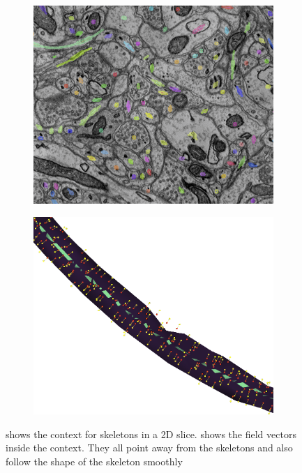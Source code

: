 \begin{figure}[htpb]
	\newcommand{\mywidth}{0.45\textwidth}
	\centering
	\begin{subfigure}[b]{\mywidth}
		\centering
		\includegraphics[width=\textwidth]{data/images/contextField/context2D.png}
		\caption{\label{fig:context}}
	\end{subfigure}
	\hspace{3mm}
	\begin{subfigure}[b]{\mywidth}
		\centering
		\includegraphics[width=\textwidth]{data/images/contextField/directions_skel_context.png}
		\caption{\label{fig:directions_skel_ctx}}
	\end{subfigure}
		\caption{ shows the context for skeletons in a 2D slice.  shows the field vectors inside the context. They all point away from the skeletons and also follow the shape of the skeleton smoothly}
		\label{fig:context_field_directions}
\end{figure}
	
